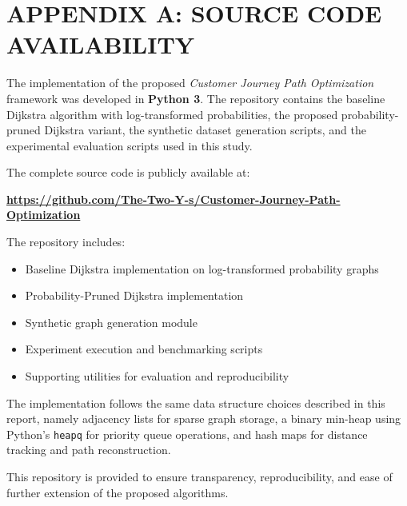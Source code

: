 \chapter*{APPENDIX A: SOURCE CODE AVAILABILITY}

The implementation of the proposed \textit{Customer Journey Path Optimization} framework was developed in \textbf{Python 3}. The repository contains the baseline Dijkstra algorithm with log-transformed probabilities, the proposed probability-pruned Dijkstra variant, the synthetic dataset generation scripts, and the experimental evaluation scripts used in this study.

The complete source code is publicly available at:

\begin{center}
\textbf{\url{https://github.com/The-Two-Y-s/Customer-Journey-Path-Optimization}}
\end{center}

The repository includes:

\begin{itemize}
    \item Baseline Dijkstra implementation on log-transformed probability graphs
    \item Probability-Pruned Dijkstra implementation
    \item Synthetic graph generation module
    \item Experiment execution and benchmarking scripts
    \item Supporting utilities for evaluation and reproducibility
\end{itemize}

The implementation follows the same data structure choices described in this report, namely adjacency lists for sparse graph storage, a binary min-heap using Python's \texttt{heapq} for priority queue operations, and hash maps for distance tracking and path reconstruction.

This repository is provided to ensure transparency, reproducibility, and ease of further extension of the proposed algorithms.